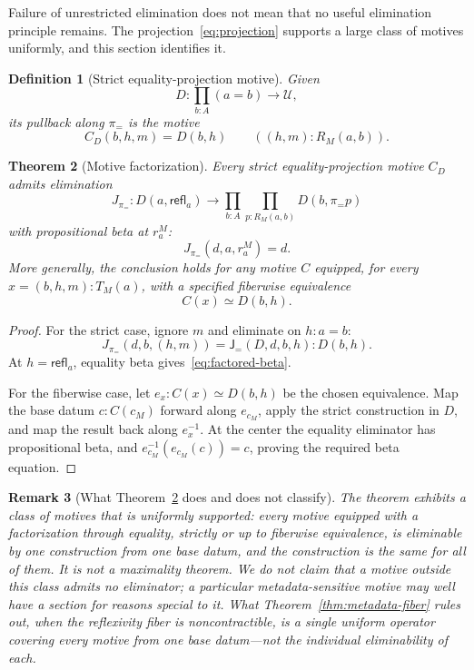 \documentclass[10pt,reqno]{amsart}
\newtheorem{theorem}{Theorem}[section]
\newtheorem{definition}[theorem]{Definition}
\newtheorem{remark}[theorem]{Remark}
\newcommand{\U}{\mathcal U}
\newcommand{\Eqv}{\simeq}
\newcommand{\refl}{\mathsf{refl}}
\newcommand{\proj}{\pi_{=}}
\begin{document}
Failure of unrestricted elimination does not mean that no useful elimination
principle remains.  The projection~\eqref{eq:projection} supports a large class
of motives uniformly, and this section identifies it.

\begin{definition}[Strict equality-projection motive]
\label{def:strict-factor}
Given
\[
                  D:\prod_{b:A}(a=b)\longrightarrow\U,
\]
its pullback along \(\proj\) is the motive
\[
       C_D(b,h,m)=D(b,h)
       \qquad ((h,m):R_M(a,b)).
\tag{7.1}\label{eq:strict-factor}
\]
\end{definition}

\begin{theorem}[Motive factorization]
\label{thm:motive-factorization}
Every strict equality-projection motive \(C_D\) admits elimination
\[
  J_{\proj}:
  D(a,\refl_a)\longrightarrow
  \prod_{b:A}\prod_{p:R_M(a,b)}D(b,\proj p)
\tag{7.2}\label{eq:factored-j}
\]
with propositional beta at \(r^M_a\):
\[
                  J_{\proj}(d,a,r^M_a)=d.
\tag{7.3}\label{eq:factored-beta}
\]
More generally, the conclusion holds for any motive \(C\) equipped, for every
\(x=(b,h,m):T_M(a)\), with a specified fiberwise equivalence
\[
                         C(x)\Eqv D(b,h).
\tag{7.4}\label{eq:fiberwise-factor}
\]
\end{theorem}

\begin{proof}
For the strict case, ignore \(m\) and eliminate on \(h:a=b\):
\[
       J_{\proj}(d,b,(h,m))
       =\mathsf J_{=}(D,d,b,h):D(b,h).
\]
At \(h=\refl_a\), equality beta gives~\eqref{eq:factored-beta}.

For the fiberwise case, let \(e_x:C(x)\Eqv D(b,h)\) be the chosen equivalence.
Map the base datum \(c:C(c_M)\) forward along \(e_{c_M}\), apply the strict
construction in \(D\), and map the result back along \(e_x^{-1}\).  At the
center the equality eliminator has propositional beta, and
\(e_{c_M}^{-1}(e_{c_M}(c))=c\), proving the required beta equation.
\end{proof}

\begin{remark}[What Theorem~\ref{thm:motive-factorization} does and does not
classify]
\label{rem:factorization-scope}
The theorem exhibits a class of motives that is uniformly supported: every
motive equipped with a factorization through equality, strictly or up to
fiberwise equivalence, is eliminable by one construction from one base datum,
and the construction is the same for all of them.  It is not a maximality
theorem.  We do not claim that a motive outside this class admits no eliminator;
a particular metadata-sensitive motive may well have a section for reasons
special to it.  What Theorem~\ref{thm:metadata-fiber} rules out, when the
reflexivity fiber is noncontractible, is a single uniform operator covering
\emph{every} motive from one base datum---not the individual eliminability of
each.
\end{remark}
\end{document}
